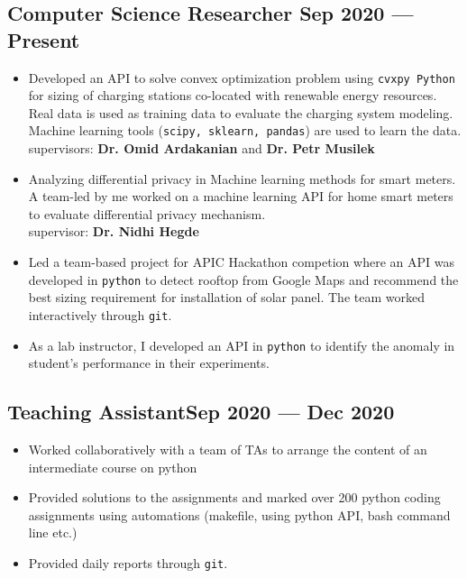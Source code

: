 \documentclass[letter,10pt]{article}
\begin{document}
\subsection{{Computer Science Researcher \hfill Sep 2020 --- Present}}
\begin{itemize}
\item Developed an API to solve convex optimization problem using \texttt{cvxpy Python} for sizing of charging stations co-located with renewable energy resources. Real data is used as training data to evaluate the charging system modeling. Machine learning tools (\texttt{scipy, sklearn, pandas}) are used to learn the data.\\
supervisors: \textbf{Dr. Omid Ardakanian} and \textbf{Dr. Petr Musilek}
\item Analyzing differential privacy in Machine learning methods for smart meters. A team-led by me worked on a machine learning API for home smart meters to evaluate differential privacy mechanism.\\
supervisor: \textbf{Dr. Nidhi Hegde}

\item Led a team-based project for APIC Hackathon competion where an API was developed in \texttt{python} to detect rooftop from Google Maps and recommend the best sizing requirement for installation of solar panel. The team worked interactively through \texttt{git}.

\item As a lab instructor, I developed an API in \texttt{python} to identify the anomaly in student's performance in their experiments. 
\end{itemize}

\subsection{{Teaching Assistant\hfill Sep 2020 --- Dec 2020}}
\begin{itemize}
	\item Worked collaboratively with a team of TAs to arrange the content of an intermediate course on python
	\item Provided solutions to the assignments and marked over 200 python coding assignments using automations (makefile, using python API, bash command line etc.)
	\item Provided daily reports through \texttt{git}.
\end{itemize}
\end{document}
